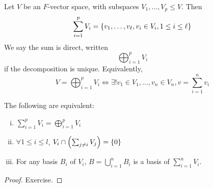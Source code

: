\begin{definition}
	Let \( V \) be an \( F \)-vector space, with subspaces \( V_1, \dots, V_p \leq V \).
	Then
	\[
		\sum_{i=1}^p V_i = \qty{ v_1, \dots, v_\ell, v_i \in V_i, 1 \leq i \leq \ell}
	\]
	We say the sum is direct, written
	\[
		\bigoplus_{i=1}^p V_i
	\]
	if the decomposition is unique.
	Equivalently,
	\[
		V = \bigoplus_{i=1}^p V_i \iff \exists!
		v_1 \in V_1, \dots, v_n \in V_n, v = \sum_{i=1}^n v_i
	\]
\end{definition}
\begin{lemma}
	The following are equivalent:
	\begin{enumerate}[(i)]
		\item \( \sum_{i=1}^p V_i = \bigoplus_{i=1}^p V_i \)
		\item \( \forall 1 \leq i \leq l \), \( V_i \cap \qty( \sum_{j \neq i} V_j ) = \{0\} \)
		\item For any basis \( B_i \) of \( V_i \), \( B = \bigcup_{i=1}^n B_i \) is a basis of \( \sum_{i=1}^n V_i \).
	\end{enumerate}
\end{lemma}
\begin{proof}
	Exercise.
\end{proof}
